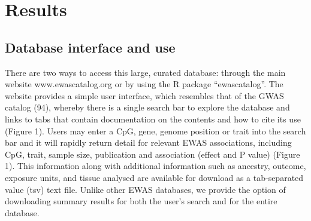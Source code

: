\documentclass[11pt,oneside]{bristolthesis}
\begin{document}
\hypertarget{results-03}{%
\section{Results}\label{results-03}}

\hypertarget{database-interface-and-use}{%
\subsection{Database interface and use}\label{database-interface-and-use}}

There are two ways to access this large, curated database: through the main website www.ewascatalog.org or by using the R package ``ewascatalog''. The website provides a simple user interface, which resembles that of the GWAS catalog (94), whereby there is a single search bar to explore the database and links to tabs that contain documentation on the contents and how to cite its use (Figure 1). Users may enter a CpG, gene, genome position or trait into the search bar and it will rapidly return detail for relevant EWAS associations, including CpG, trait, sample size, publication and association (effect and P value) (Figure 1). This information along with additional information such as ancestry, outcome, exposure units, and tissue analysed are available for download as a tab-separated value (tsv) text file. Unlike other EWAS databases, we provide the option of downloading summary results for both the user's search and for the entire database.
\end{document}
